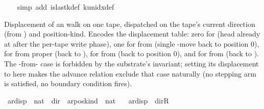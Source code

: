 \begin{isabellebody}
%
\isadelimproof
\ \ %
\endisadelimproof
%
\isatagproof
{}\isamarkupfalse%
\ {\isacharparenleft}{\kern0pt}simp\ add{\isacharcolon}{\kern0pt}\ is{\isacharunderscore}{\kern0pt}last{\isacharunderscore}{\kern0pt}k{\isacharunderscore}{\kern0pt}def\ k{\isacharunderscore}{\kern0pt}unidx{\isacharunderscore}{\kern0pt}def{\isacharparenright}{\kern0pt}%
\endisatagproof
{\isafoldproof}%
%
\isadelimproof
%
\endisadelimproof
%
\isadelimdocument
%
\endisadelimdocument
%
\isatagdocument
%
\isamarkuptrue%
%
\endisatagdocument
{\isafolddocument}%
%
\isadelimdocument
%
\endisadelimdocument
%
\begin{isamarkuptext}%
Displacement of an  walk on one
  tape, dispatched on the tape's current direction (from
  ) and position-kind.  Encodes the displacement
  table: zero
  for 
  (head already at  after the per-tape
  write phase), one for  from 
  (single -move back to position 0),
   for  from proper (back to
  ),  for 
  from  (back to position 0), and
   for  from
   (back to ).
  The -from- case is forbidden by
  the substrate's  invariant; setting its
  displacement to  here makes the advance relation
  exclude that case naturally (no stepping arm is satisfied, no
  boundary condition fires).%
\end{isamarkuptext}\isamarkuptrue%
\isamarkupfalse%
\ ar{\isacharunderscore}{\kern0pt}disp\ {\isacharcolon}{\kern0pt}{\isacharcolon}{\kern0pt}\ {\isachardoublequoteopen}nat\ {\isasymRightarrow}\ dir\ {\isasymRightarrow}\ ar{\isacharunderscore}{\kern0pt}pos{\isacharunderscore}{\kern0pt}kind\ {\isasymRightarrow}\ nat{\isachardoublequoteclose}\ \isanewline
\ \ {\isachardoublequoteopen}ar{\isacharunderscore}{\kern0pt}disp\ {\isacharunderscore}{\kern0pt}\ dir{\isachardot}{\kern0pt}R\ {\isacharunderscore}{\kern0pt}\ \ \ \ \ \ \ \ \ \ \ \ \ \ \ \ \ \ {\isacharequal}{\kern0pt}\ {}{\isachardoublequoteclose}\isanewline

\end{isabellebody}
